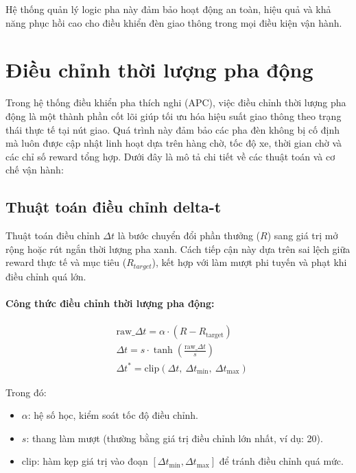 Hệ thống quản lý logic pha này đảm bảo hoạt động an toàn, hiệu quả và khả năng phục hồi cao cho điều khiển đèn giao thông trong mọi điều kiện vận hành.

\section{Điều chỉnh thời lượng pha động}

Trong hệ thống điều khiển pha thích nghi (APC), việc điều chỉnh thời lượng pha động là một thành phần cốt lõi giúp tối ưu hóa hiệu suất giao thông theo trạng thái thực tế tại nút giao. Quá trình này đảm bảo các pha đèn không bị cố định mà luôn được cập nhật linh hoạt dựa trên hàng chờ, tốc độ xe, thời gian chờ và các chỉ số reward tổng hợp. Dưới đây là mô tả chi tiết về các thuật toán và cơ chế vận hành:

\subsection{Thuật toán điều chỉnh delta-t}

Thuật toán điều chỉnh \(\Delta t\) là bước chuyển đổi phần thưởng (\(R\)) sang giá trị mở rộng hoặc rút ngắn thời lượng pha xanh. Cách tiếp cận này dựa trên sai lệch giữa reward thực tế và mục tiêu (\(R_{target}\)), kết hợp với làm mượt phi tuyến và phạt khi điều chỉnh quá lớn.

\paragraph{Công thức điều chỉnh thời lượng pha động:}
\[
\begin{aligned}
&\text{raw\_}\Delta t = \alpha \cdot (R - R_{\text{target}}) \\
&\Delta t = s \cdot \tanh\left(\frac{\text{raw\_}\Delta t}{s}\right) \\
&\Delta t^* = \mathrm{clip}\left(\Delta t,\ \Delta t_{\min},\ \Delta t_{\max}\right)
\end{aligned}
\]

Trong đó:
\begin{itemize}
    \item \(\alpha\): hệ số học, kiểm soát tốc độ điều chỉnh.
    \item \(s\): thang làm mượt (thường bằng giá trị điều chỉnh lớn nhất, ví dụ: 20).
    \item \(\mathrm{clip}\): hàm kẹp giá trị vào đoạn \([\Delta t_{\min}, \Delta t_{\max}]\) để tránh điều chỉnh quá mức.
\end{itemize}

